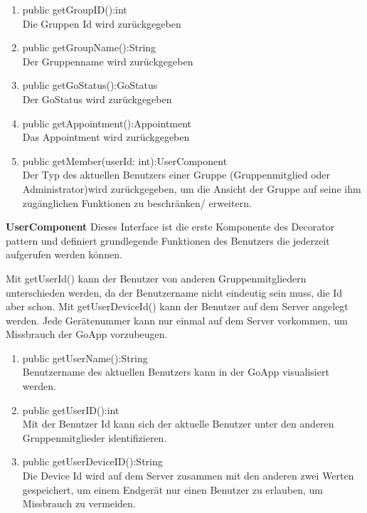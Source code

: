 \begin{enumerate}
	\item public getGroupID():int \\
		Die Gruppen Id wird zurückgegeben
	\item public getGroupName():String\\
		Der Gruppenname wird zurückgegeben 
	\item public getGoStatus():GoStatus \\
		Der GoStatus wird zurückgegeben
	\item public getAppointment():Appointment \\
		Das Appointment wird zurückgegeben
	\item public getMember(userId: int):UserComponent \\
		Der Typ des aktuellen Benutzers einer Gruppe (Gruppenmitglied oder Administrator)wird zurückgegeben, um die Ansicht der Gruppe auf seine ihm zugänglichen Funktionen zu beschränken/ erweitern.
\end{enumerate}

\textbf{UserComponent}
Dieses Interface ist die erste Komponente des Decorator pattern und definiert grundlegende Funktionen des Benutzers die jederzeit aufgerufen werden können. 

Mit getUserId() kann der Benutzer von anderen Gruppenmitgliedern unterschieden werden, da der Benutzername nicht eindeutig sein muss, die Id aber schon.
Mit getUserDeviceId() kann der Benutzer auf dem Server angelegt werden. Jede Gerätenummer kann nur einmal auf dem Server vorkommen, um Missbrauch der GoApp vorzubeugen.
\begin{enumerate}
	\item public getUserName():String\\
		Benutzername des aktuellen Benutzers kann in der GoApp visualisiert werden.
	\item public getUserID():int\\
		Mit der Benutzer Id kann sich der aktuelle Benutzer unter den anderen Gruppenmitglieder identifizieren.
	\item public getUserDeviceID():String\\
		Die Device Id wird auf dem Server zusammen mit den anderen zwei Werten gespeichert, um einem Endgerät nur einen Benutzer zu erlauben, um Missbrauch zu vermeiden.
\end{enumerate}

